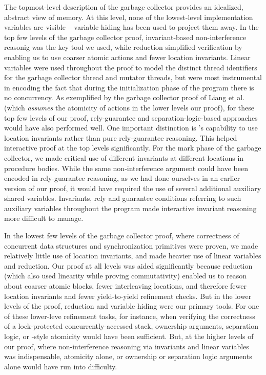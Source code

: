 The topmost-level description of the garbage collector provides an
idealized, abstract view of memory. 
At this level, none of the lowest-level implementation variables are
visible -- variable hiding has been used to project them away. 
In the top few levels of the garbage collector proof, invariant-based
non-interference reasonig was the key tool we used, while reduction
simplified verification by enabling us to use coarser atomic actions and fewer
location invariants.  
Linear variables were used throughout the proof to model the distinct
thread identifiers for the garbage collector thread and mutator
threads, but were most instrumental in encoding the fact that during
the initialization phase of the program there is no concurrency.
As exemplified by the
garbage collector proof of Liang et al.~\cite{LiangRGSim} (which
{\em assumes} the atomicity of actions in the lower levels our proof),
for these top few levels of our proof, rely-guarantee and separation-logic-based
approaches would have also performed well. 
One important distinction is \civl's capability to use location invariants rather than pure rely-guarantee reasoning.
This helped interactive proof at the top levels significantly.
For the mark phase of the garbage collector, we made critical use of different invariants at different
locations in procedure bodies. 
While the same non-interference argument could have been encoded in
rely-guarantee reasoning, as we had done ourselves in an earlier
version of our proof, 
it would have required the use of several additional auxiliary shared variables. 
Invariants, rely and guarantee conditions referring to such auxiliary
variables throughout the program made interactive invariant reasoning more difficult to manage. 

In the lowest few levels of the garbage collector proof, where
correctness of concurrent data structures and synchronization primitives were proven, we made
relatively little use of location invariants, and made heavier use of
linear variables and reduction.
Our proof at all levels was aided significantly because
reduction (which also used linearity while proving commutativity)
enabled us to reason about coarser atomic blocks, fewer interleaving
locations, and therefore fewer location invariants and fewer 
yield-to-yield refinement checks. 
But in the lower levels of the proof, reduction and variable hiding were our primary
tools. 
For one of these lower-leve refinement tasks, for instance, when verifying the correctness of a
lock-protected concurrently-accessed stack, ownership
arguments, separation logic, or \QED-style atomicity would have been
sufficient. 
But, at the higher levels of our proof, where non-interference
reasoning via invariants and linear variables was indispensable, 
atomicity alone, or ownership or separation logic arguments alone
would have run into difficulty. 

